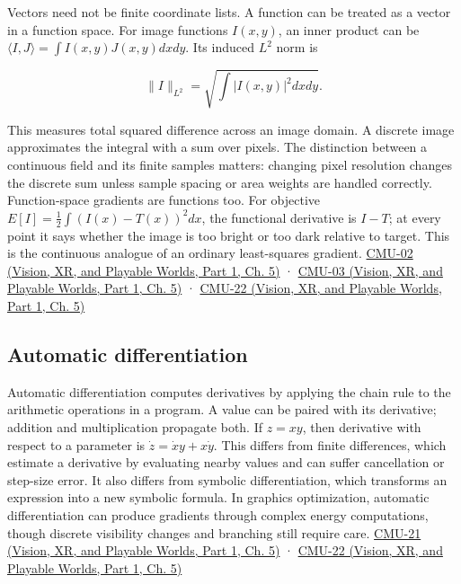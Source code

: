Vectors need not be finite coordinate lists. A function can be treated as a vector in a function space. For image functions \(I(x,y)\), an inner product can be \(\langle I,J\rangle=\int I(x,y)J(x,y)dxdy\). Its induced \(L^2\) norm is

\[
\|I\|_{L^2}=\sqrt{\int |I(x,y)|^2dxdy}.
\]

This measures total squared difference across an image domain. A discrete image approximates the integral with a sum over pixels. The distinction between a continuous field and its finite samples matters: changing pixel resolution changes the discrete sum unless sample spacing or area weights are handled correctly. Function-space gradients are functions too. For objective \(E[I]=\tfrac12\int (I(x)-T(x))^2dx\), the functional derivative is \(I-T\); at every point it says whether the image is too bright or too dark relative to target. This is the continuous analogue of an ordinary least-squares gradient. \href{../07-Vision-XR-and-Playable-Worlds-P01/main.pdf\#nameddest=04-visual-computing-ii-ch036-cmu-02---linear-algebra-preview}{CMU-02 (Vision, XR, and Playable Worlds, Part 1, Ch. 5)} · \href{../07-Vision-XR-and-Playable-Worlds-P01/main.pdf\#nameddest=04-visual-computing-ii-ch036-cmu-03---vector-calculus-preview}{CMU-03 (Vision, XR, and Playable Worlds, Part 1, Ch. 5)} · \href{../07-Vision-XR-and-Playable-Worlds-P01/main.pdf\#nameddest=04-visual-computing-ii-ch036-cmu-22---optimization}{CMU-22 (Vision, XR, and Playable Worlds, Part 1, Ch. 5)}

\subsection{Automatic differentiation}\label{04-visual-computing-ii-ch029-automatic-differentiation}

\hypertarget{04-visual-computing-ii-ch029-automatic-differentiation}{}

Automatic differentiation computes derivatives by applying the chain rule to the arithmetic operations in a program. A value can be paired with its derivative; addition and multiplication propagate both. If \(z=xy\), then derivative with respect to a parameter is \(\dot z=\dot x y+x\dot y\). This differs from finite differences, which estimate a derivative by evaluating nearby values and can suffer cancellation or step-size error. It also differs from symbolic differentiation, which transforms an expression into a new symbolic formula. In graphics optimization, automatic differentiation can produce gradients through complex energy computations, though discrete visibility changes and branching still require care. \href{../07-Vision-XR-and-Playable-Worlds-P01/main.pdf\#nameddest=04-visual-computing-ii-ch036-cmu-21---dynamics-and-time-integration}{CMU-21 (Vision, XR, and Playable Worlds, Part 1, Ch. 5)} · \href{../07-Vision-XR-and-Playable-Worlds-P01/main.pdf\#nameddest=04-visual-computing-ii-ch036-cmu-22---optimization}{CMU-22 (Vision, XR, and Playable Worlds, Part 1, Ch. 5)}

